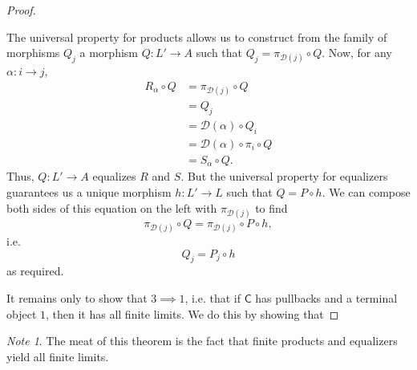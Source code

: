 \documentclass[a4paper]{report}
\theoremstyle{definition}
\theoremstyle{plain}
\theoremstyle{remark}
\newtheorem{note}{Note}[section]
\begin{document}
\begin{proof}
\begin{enumerate}
      The universal property for products allows us to construct from the family of morphisms $Q_{j}$ a morphism $Q\colon L' \to A$ such that $Q_{j} = \pi_{\mathcal{D}(j)} \circ Q$. Now, for any $\alpha\colon i \to j$,
      \begin{align*}
        R_{\alpha} \circ Q &= \pi_{\mathcal{D}(j)} \circ Q \\
        &= Q_{j} \\
        &= \mathcal{D}(\alpha) \circ Q_{i} \\
        &= \mathcal{D}(\alpha) \circ \pi_{i} \circ Q \\
        &= S_{\alpha} \circ Q.
      \end{align*}
      Thus, $Q\colon L' \to A$ equalizes $R$ and $S$. But the universal property for equalizers guarantees us a unique morphism $h\colon L' \to L$ such that $Q = P \circ h$. We can compose both sides of this equation on the left with $\pi_{\mathcal{D}(j)}$ to find
      \begin{equation*}
        \pi_{\mathcal{D}(j)} \circ Q = \pi_{\mathcal{D}(j)} \circ P \circ h,
      \end{equation*}
      i.e.
      \begin{equation*}
        Q_{j} = P_{j} \circ h
      \end{equation*}
      as required.
  \end{enumerate}

  It remains only to show that $3 \implies 1$, i.e. that if $\mathsf{C}$ has pullbacks and a terminal object $1$, then it has all finite limits. We do this by showing that 
\end{proof}

\begin{note}
  The meat of this theorem is the fact that finite products and equalizers yield all finite limits.
\end{note}
\end{document}
